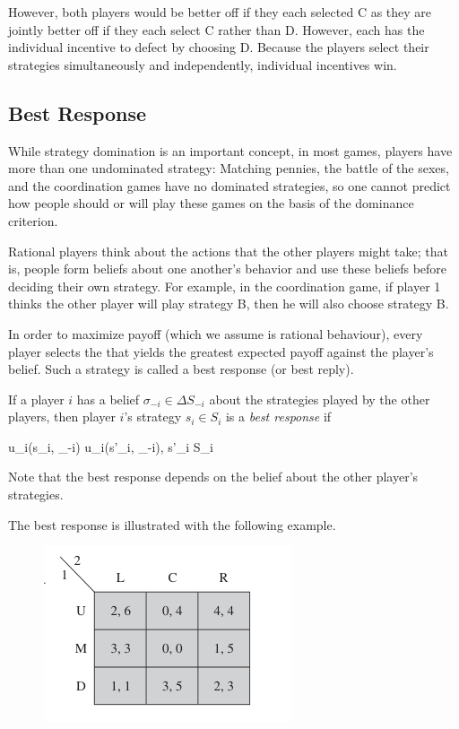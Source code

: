 However, both players would be better off if they each selected C as they are jointly better off if they each select C rather than D. However, each has the individual incentive to defect by choosing D. Because the players select their strategies simultaneously and independently, individual incentives win.



\subsection{Best Response}

While strategy domination is an important concept, in most games, players have more than one undominated strategy: Matching pennies, the battle of the sexes, and the coordination games have no dominated strategies, so one cannot predict how people should or will play these games on the basis of the dominance criterion.

Rational players think about the actions that the other players might take; that is, people form beliefs about one another’s behavior and use these beliefs before deciding their own strategy. For example, in the coordination game, if player 1 thinks the other player will play strategy B, then he will also choose strategy B. 

In order to maximize payoff (which we assume is rational behaviour), every player selects the that yields the greatest expected payoff against the player's belief. Such a strategy is called a best response (or best reply).

\begin{definition}
	If a player $i$ has  a belief $\sigma_{-i} \in \Delta S_{-i}$ about the strategies played by the other players, then player $i$'s strategy $s_i \in S_i$ is a \emph{best response} if
	
	\bee
		u_i(s_i, \theta_{-i}) \geq u_i(s'_i, \theta_{-i}), \quad \forall s'_i \in S_i
	\eee
\end{definition}

Note that the best response depends on the belief about the other player's strategies.

The best response is illustrated with the following example.

\begin{figure}[H]
    \centering
    \includegraphics[scale=0.7]{images/2023-11-21-game_theory_02.png}
\end{figure}

